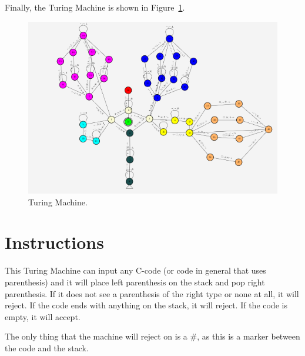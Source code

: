 \documentclass{article}
\begin{document}
Finally, the Turing Machine is shown in Figure\ \ref{fig:stackqueue}.
\begin{figure}
    \includegraphics[width=\linewidth]{stackqueue.png}
    \caption{Turing Machine.}\label{fig:stackqueue}
\end{figure}

\section{Instructions}
This Turing Machine can input any C-code (or code in general that uses parenthesis) and it will place left parenthesis on the stack and pop
right parenthesis. If it does not see a parenthesis of the right type or none at all, it will reject. If the code ends with anything on the
stack, it will reject. If the code is empty, it will accept. 

The only thing that the machine will reject on is a $\#$, as this is a marker between the code and the stack.
\end{document}
